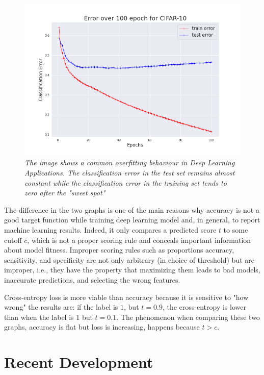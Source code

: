 \documentclass[11pt,a4paper]{article}
\begin{document}
\begin{figure}[H]
  \centering
  \includegraphics[scale=0.4]{../images/cifar10_100epochs_error.png}
  \caption{\textit{The image shows a common overfitting behaviour in Deep Learning Applications. The classification error in the test set remains almost constant while the classification error in the training set tends to zero after the "sweet spot"}}
  \label{cifar-overfit-error}
\end{figure}

The difference in the two graphs is one of the main reasons why accuracy is not a good target function while training deep learning model and, in general, to report machine learning results. Indeed, it only compares a predicted score $t$ to some cutoff $c$, which is not a proper scoring rule and conceals important information about model fitness.
Improper scoring rules such as proportions accuracy, sensitivity, and specificity are not only arbitrary (in choice of threshold) but are improper, i.e., they have the property that maximizing them leads to bad models, inaccurate predictions, and selecting the wrong features. 

Cross-entropy loss is more viable than accuracy because it is sensitive to "how wrong" the results are: if the label is $1$, but $t=0.9$, the cross-entropy is lower than when the label is $1$ but $t=0.1$.
The phenomenon when comparing these two graphs, accuracy is flat but loss is increasing, happens because $t>c$.

\section*{Recent Development}
\end{document}
